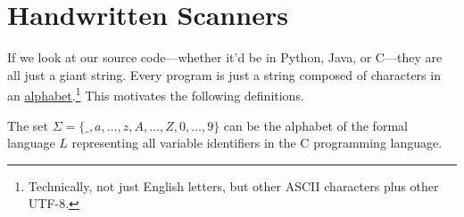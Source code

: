 \section{Handwritten Scanners}

	If we look at our source code---whether it'd be in Python, Java, or C---they are all just a giant string. Every program is just a string composed of characters in an \hyperref[th-def:alphabet]{alphabet}.\footnote{Technically, not just English letters, but other ASCII characters plus other UTF-8.} This motivates the following definitions. 

  \begin{example}[C Identifiers]
    \label{ex:c-identifiers}
    The set $\Sigma = \{\_, a, \ldots, z, A, \ldots, Z, 0, \ldots, 9\}$ can be the alphabet of the formal language $L$ representing all variable identifiers in the C programming language. 
  \end{example}

